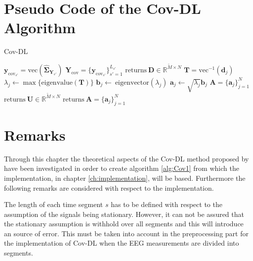 


\section{Pseudo Code of the Cov-DL Algorithm}\label{seg:alg_cov}
\begin{algorithm}[H]
\caption{Cov-DL}
\begin{algorithmic}[1]
				\State$\textbf{y}_{\text{cov}_{s'}} = \text{vec}\left( \widehat{\boldsymbol{\Sigma}}_{\mathbf{Y}_{s'}} \right)$	
			\EndFor			
			\State$\textbf{Y}_{\text{cov}} = \{\textbf{y}_{\text{cov}_{s'}}\}_{s'=1}^{L_{s'}}$
			\State
			\State$\text{returns} \ \textbf{D} \in \mathbb{R}^{\widetilde{M}\times N}$
			\EndProcedure
			\State$\textbf{T} = \text{vec}^{-1}(\textbf{d}_j)$            
			\State$\lambda_j\gets \max\{\text{eigenvalue}(\textbf{T})\}$
			\State$\textbf{b}_j \gets \ \text{eigenvector}(\lambda_j)$
			\State$\textbf{a}_j \gets \sqrt{\lambda_j}\textbf{b}_j$
			\EndFor
			\State$\textbf{A} = \{\textbf{a}_j\}_{j=1}^N$
			\EndIf
			\State
				\State$\text{returns} \ \textbf{U}\in \mathbb{R}^{\widetilde{M}\times N}$
				\EndProcedure
				\State$\text{returns}\ \textbf{A}= \{\textbf{a}_j\}_{j=1}^{N}$
				\EndProcedure
			\EndIf
           \EndProcedure
        \end{algorithmic} 
        \label{alg:Cov1}
\end{algorithm}

\section{Remarks}
Through this chapter the theoretical aspects of the Cov-DL method proposed by \cite{Balkan2015} have been investigated in order to create algorithm \ref{alg:Cov1} from which the implementation, in chapter \ref{ch:implementation}, will be based. Furthermore the following remarks are considered with respect to the implementation.   

The length of each time segment $s$ has to be defined with respect to the assumption of the signals being stationary. However, it can not be assured that the stationary assumption is withhold over all segments and this will introduce an source of error. 
This must be taken into account in the preprocessing part for the implementation of Cov-DL when the EEG measurements are divided into segments.

